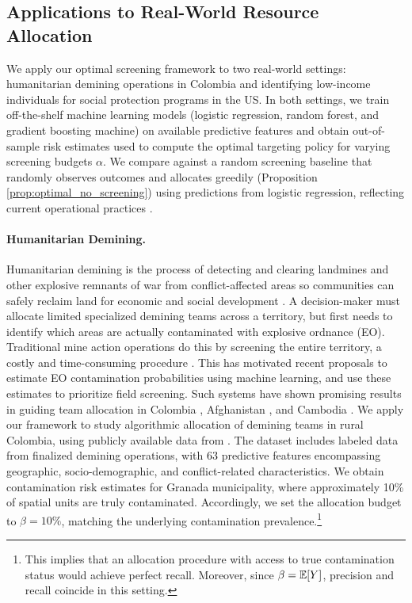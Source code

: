 \subsection{Applications to Real-World Resource Allocation} 
We apply our optimal screening framework to two real-world settings: humanitarian demining operations in Colombia and identifying low-income individuals for social protection programs in the US. In both settings, we train off-the-shelf machine learning models (logistic regression, random forest, and gradient boosting machine) on available predictive features and obtain out-of-sample risk estimates used to compute the optimal targeting policy for varying screening budgets $\alpha$. We compare against a random screening baseline that randomly observes outcomes and allocates greedily (Proposition \ref{prop:optimal_no_screening}) using predictions from logistic regression, reflecting current operational practices \cite{dulce2024reland}.


\paragraph{Humanitarian Demining.} Humanitarian demining is the process of detecting and clearing landmines and other explosive remnants of war from conflict-affected areas so communities can safely reclaim land for economic and social development \cite{un_landmines}. A decision-maker must allocate limited specialized demining teams across a territory, but first needs to identify which areas are actually contaminated with explosive ordnance (EO). Traditional mine action operations do this by screening the entire territory, a costly and time-consuming procedure \cite{Harutyunyan2023OperationalEfficiency}. This has motivated recent proposals to estimate EO contamination probabilities using machine learning, and use these estimates to prioritize field screening. Such systems have shown promising results in guiding team allocation in Colombia \cite{dulce2024reland}, Afghanistan \cite{collins28advancements}, and Cambodia \cite{cirillo2024desk}. We apply our framework to study algorithmic allocation of demining teams in rural Colombia, using publicly available data from \cite{dulce2024reland}. The dataset includes labeled data from finalized demining operations, with 63 predictive features encompassing geographic, socio-demographic, and conflict-related characteristics. We obtain contamination risk estimates for Granada municipality, where approximately 10\% of spatial units are truly contaminated. Accordingly, we set the allocation budget to $\beta = 10\%$, matching the underlying contamination prevalence.\footnote{This implies that an allocation procedure with access to true contamination status would achieve perfect recall. Moreover, since $\beta = \mathbb{E}[Y]$, precision and recall coincide in this setting.}

